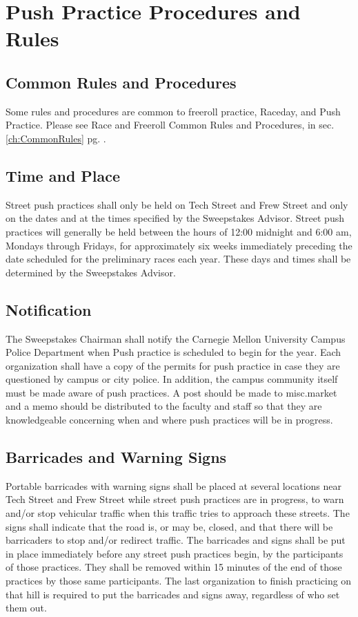 \section{Push Practice Procedures and Rules}
\label{sec:PushPRules}

\subsection{Common Rules and Procedures}
	Some rules and procedures are common to freeroll practice, Raceday, and Push Practice. Please see Race and Freeroll Common Rules and Procedures, in sec. \ref{ch:CommonRules} pg. \pageref{ch:CommonRules}.
	
\subsection{Time and Place}

	Street push practices shall only be held on Tech Street and Frew Street and only on the dates and at the times specified by the Sweepstakes Advisor. Street push practices will generally be held between the hours of 12:00 midnight and 6:00 am, Mondays through Fridays, for approximately six weeks immediately preceding the date scheduled for the preliminary races each year. These days and times shall be determined by the Sweepstakes Advisor.

\subsection{Notification}

	The Sweepstakes Chairman shall notify the Carnegie Mellon University Campus Police Department when Push practice is scheduled to begin for the year. Each organization shall have a copy of the permits for push practice in case they are questioned by campus or city police. In addition, the campus community itself must be made aware of push practices. A post should be made to misc.market and a memo should be distributed to the faculty and staff so that they are knowledgeable concerning when and where push practices will be in progress.

\subsection{Barricades and Warning Signs}
\label{subsec:Freeroll Barricades}

	Portable barricades with warning signs shall be placed at several locations near Tech Street and Frew Street while street push practices are in progress, to warn and/or stop vehicular traffic when this traffic tries to approach these streets. The signs shall indicate that the road is, or may be, closed, and that there will be barricaders to stop and/or redirect traffic. The barricades and signs shall be put in place immediately before any street push practices begin, by the participants of those practices. They shall be removed within 15 minutes of the end of those practices by those same participants. The last organization to finish practicing on that hill is required to put the barricades and signs away, regardless of who set them out.


